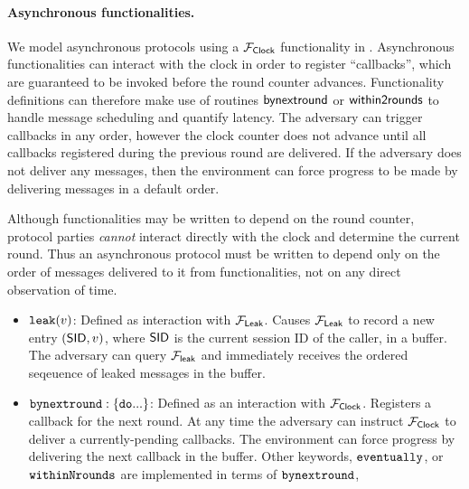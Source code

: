 \paragraph{Asynchronous functionalities.}
We model asynchronous protocols using a $\F{Clock}$ functionality in \SaUCy. Asynchronous functionalities can interact with the clock in order to register ``callbacks'', which are guaranteed to be invoked before the round counter advances. Functionality definitions can therefore make use of routines ${\mathsf {by next round}}$ or ${\mathsf {within 2 rounds}}$ to handle message scheduling and quantify latency. The adversary can trigger callbacks in any order, however the clock counter does not advance until all callbacks registered during the previous round are delivered. If the adversary does not deliver any messages, then the environment can force progress to be made by delivering messages in a default order.

Although functionalities may be written to depend on the round counter, protocol parties \emph{cannot} interact directly with the clock and determine the current round. Thus an asynchronous protocol must be written to depend only on the order of messages delivered to it from functionalities, not on any direct observation of time.

\begin{itemize}
\item $\mathtt {leak}(v)$: Defined as interaction with $\F{Leak}$. Causes $\F{Leak}$ to record a new entry $({\mathsf {SID}},v)$, where ${\mathsf {SID}}$ is the current session ID of the caller, in a buffer.  The adversary can query $\F{leak}$ and immediately receives the ordered seqeuence of leaked messages in the buffer.
\item $\mathtt {by next round: \{do...\}}$: Defined as an interaction with $\F{Clock}$. Registers a callback for the next round. At any time the adversary can instruct $\F{Clock}$ to deliver a currently-pending callbacks. The environment can force progress by delivering the next callback in the buffer. Other keywords, $\mathtt {eventually}$, or $\mathtt {within N rounds}$ are implemented in terms of $\mathtt {by next round}$,
\end{itemize}

